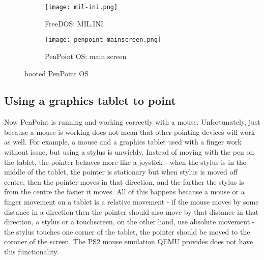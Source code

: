 \begin{figure}[H]
    \centering
    \begin{subfigure}[b]{0.45\linewidth}
        \texttt{[image: mil-ini.png]}
        \caption{FreeDOS: MIL.INI}
        \label{fig:mil-ini}
    \end{subfigure}
    \hfill
    \begin{subfigure}[b]{0.45\linewidth}
        \texttt{[image: penpoint-mainscreen.png]}
        \caption{PenPoint OS: main screen}
        \label{fig:penpoint-mainscreen}
    \end{subfigure}
    \caption{booted PenPoint OS}
\end{figure}

\subsection{Using a graphics tablet to point}

Now PenPoint is running and working correctly with a mouse.  Unfortunately, just
because a mouse is working does not mean that other pointing devices will work
as well.  For example, a mouse and a graphics tablet used with a finger work
without issue, but using a stylus is unwieldy.  Instead of moving with the pen
on the tablet, the pointer behaves more like a joystick - when the stylus is in
the middle of the tablet, the pointer is stationary but when stylus is moved off
centre, then the pointer moves in that direction, and the farther the stylus is
from the centre the faster it moves.  All of this happens because a mouse or
a finger movement on a tablet is a relative movement - if the mouse moves by some
distance in a direction then the pointer should also move by that distance in
that direction, a stylus or a touchscreen, on the other hand, use absolute
movement - the stylus touches one corner of the tablet, the pointer should be
moved to the coroner of the screen.  The PS2 mouse emulation QEMU provides does
not have this functionality.

